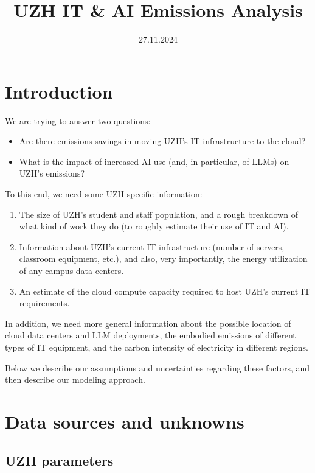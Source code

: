 \documentclass[11pt]{article}
\begin{document}
\title{UZH IT \& AI Emissions Analysis}
\date{27.11.2024}

\section*{Introduction}

We are trying to answer two questions:
\begin{itemize}
    \item Are there emissions savings in moving UZH's IT infrastructure to the cloud?
    \item What is the impact of increased AI use (and, in particular, of LLMs) on UZH's emissions?
\end{itemize}

To this end, we need some UZH-specific information:
\begin{enumerate}
    \item The size of UZH's student and staff population, and a rough breakdown of
        what kind of work they do (to roughly estimate their use of IT and AI).
    \item Information about UZH's current IT infrastructure (number of servers,
        classroom equipment, etc.), and also, very importantly, the energy utilization of any
        campus data centers.
    \item An estimate of the cloud compute capacity required to host UZH's current IT requirements.
\end{enumerate}

In addition, we need more general information about the possible location of cloud data centers and
LLM deployments, the embodied emissions of different types of IT equipment, and the carbon intensity
of electricity in different regions.

Below we describe our assumptions and uncertainties regarding these factors, and then describe
our modeling approach.

\section*{Data sources and unknowns}

\cite{budennyy2022eco2ai}
\cite{castano2023exploring}
\cite{devries2023growing}
\cite{gowda2024watt}
\cite{heguerte2023estimate}
\cite{luccioni2023counting}
\cite{patterson2021carbon}
\cite{rodriguez2024evaluating}
\cite{tomlinson2024carbon}
\cite{tripp2024measuring}

\subsection*{UZH parameters}
\end{document}
